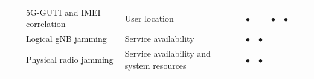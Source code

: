 \documentclass{report}
\begin{document}
\begin{table}[H]
\begin{tabularx}{\textwidth}{|l|l|X|X|c|c|c|c|c|c|}
           &                          & 5G-GUTI and IMEI correlation & User location & $\bullet$ &  & $\bullet$ & $\bullet$ &  &  \\ \cline{3-10}
           &                          & Logical gNB jamming & Service availability & $\bullet$ & $\bullet$ &  &  &  &  \\ \cline{3-10}
           &                          & Physical radio jamming & Service availability and system resources & $\bullet$ & $\bullet$ &  &  &  &  \\ \hline
        \end{tabularx}
\end{table}
\end{document}
